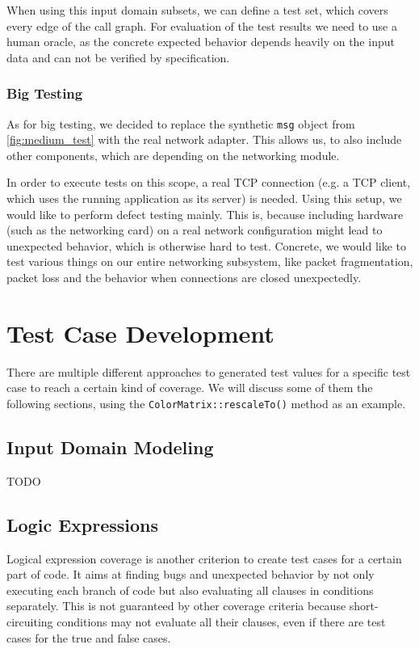 \documentclass{scrreprt}
\begin{document}
When using this input domain subsets, we can define a test set, which covers every edge of the call graph. For evaluation of the test results we need to use a human oracle, as the concrete expected behavior depends heavily on the input data and can not be verified by specification.

\subsubsection{Big Testing}

As for big testing, we decided to replace the synthetic \texttt{msg} object from \vref{fig:medium_test} with the real network adapter. This allows us, to also include other components, which are depending on the networking module.

In order to execute tests on this scope, a real TCP connection (e.g. a TCP client, which uses the running application as its server) is needed. Using this setup, we would like to perform defect testing mainly. This is, because including hardware (such as the networking card) on a real network configuration might lead to unexpected behavior, which is otherwise hard to test. Concrete, we would like to test various things on our entire networking subsystem, like packet fragmentation, packet loss and the behavior when connections are closed unexpectedly. %

\section{Test Case Development}

There are multiple different approaches to generated test values for a specific test case to reach a certain kind of coverage. We will discuss some of them the following sections, using the \texttt{ColorMatrix::rescaleTo()} method as an example.

\subsection{Input Domain Modeling}

TODO


\subsection{Logic Expressions}

Logical expression coverage is another criterion to create test cases for a certain part of code. It aims at finding bugs and unexpected behavior by not only executing each branch of code but also evaluating all clauses in conditions separately. This is not guaranteed by other coverage criteria because short-circuiting conditions may not evaluate all their clauses, even if there are test cases for the true and false cases.
\end{document}

